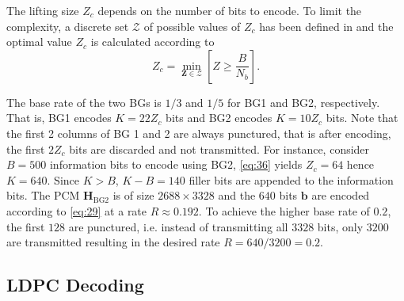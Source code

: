 \documentclass{article}
\def\b{\mathbf{b}}
\def\Hbgt{\mathbf{H}_\mathrm{BG2}}
\def\Nb{{N_b}}
\def\Z{\mathbf{Z}}
\def\Zc{{Z_c}}
\begin{document}
The lifting size $\Zc$ depends on the number of bits to encode. To limit the complexity, a discrete set $\mathcal{Z}$ of possible values of $\Zc$ has been defined in \cite{3gpp2017_38212} and the optimal value $\Zc$ is calculated according to
\begin{equation}
  \label{eq:36}
  \Zc = \min_{\Z\in\mathcal{Z}}\left[Z\geq\frac{B}{\Nb}\right].
\end{equation}

The base rate of the two BGs is $1/3$ and $1/5$ for BG1 and BG2, respectively. That is, BG1 encodes $K=22\Zc$ bits and BG2 encodes $K=10\Zc$ bits. Note that the first 2 columns of BG 1 and 2 are always punctured, that is after encoding, the first $2\Zc$ bits are discarded and not transmitted.
For instance, consider $B=500$ information bits to encode using BG2, \eqref{eq:36} yields $\Zc=64$ hence $K=640$. Since $K>B$, $K-B=140$ filler bits are appended to the information bits. The PCM $\Hbgt$ is of size $2688\times 3328$ and the $640$ bits $\b$ are encoded according to \eqref{eq:29} at a rate $R \approx 0.192$. To achieve the higher base rate of $0.2$, the first $128$ are punctured, i.e. instead of transmitting all $3328$ bits, only $3200$ are transmitted resulting in the desired rate $R=640/3200=0.2$.

\subsection{LDPC Decoding}
\label{sec:ldpc-decoding}
\end{document}
